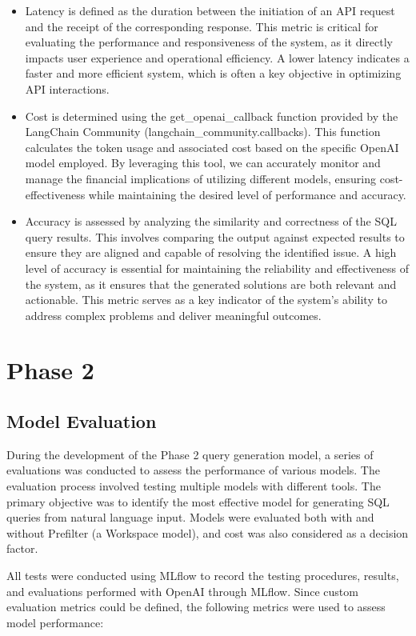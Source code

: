     \begin{itemize}
        \item Latency is defined as the duration between the initiation of an API request and the receipt of the corresponding response. This metric is critical for evaluating the performance and responsiveness of the system, as it directly impacts user experience and operational efficiency. A lower latency indicates a faster and more efficient system, which is often a key objective in optimizing API interactions.
        \item Cost is determined using the get\_openai\_callback function provided by the LangChain Community (langchain\_community.callbacks). This function calculates the token usage and associated cost based on the specific OpenAI model employed. By leveraging this tool, we can accurately monitor and manage the financial implications of utilizing different models, ensuring cost-effectiveness while maintaining the desired level of performance and accuracy.
        \item Accuracy is assessed by analyzing the similarity and correctness of the SQL query results. This involves comparing the output against expected results to ensure they are aligned and capable of resolving the identified issue. A high level of accuracy is essential for maintaining the reliability and effectiveness of the system, as it ensures that the generated solutions are both relevant and actionable. This metric serves as a key indicator of the system's ability to address complex problems and deliver meaningful outcomes.
    \end{itemize}
\pagebreak

\section{Phase 2}
    \subsection{Model Evaluation}
    During the development of the Phase 2 query generation model, a series of evaluations was conducted to assess the performance of various models. The evaluation process involved testing multiple models with different tools. The primary objective was to identify the most effective model for generating SQL queries from natural language input. Models were evaluated both with and without Prefilter (a Workspace model), and cost was also considered as a decision factor.

    All tests were conducted using MLflow to record the testing procedures, results, and evaluations performed with OpenAI through MLflow. Since custom evaluation metrics could be defined, the following metrics were used to assess model performance:

